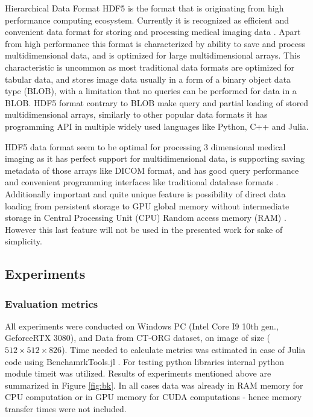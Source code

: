 \documentclass[preprint,12pt]{elsarticle}
\begin{document}
Hierarchical Data Format HDF5 \cite{hdf5} is the format that is originating from high performance computing ecosystem. Currently it is recognized as efficient and convenient data format for  storing and processing medical imaging data \cite{hdf5Medical}. Apart from high performance this format is characterized by ability to save and process multidimensional data, and is optimized for large multidimensional arrays. This characteristic is uncommon as most traditional data formats are optimized for tabular data, and stores image data usually in a form of a binary object data type (BLOB), with a limitation that no queries can be performed for data in a BLOB. HDF5 format contrary to BLOB make query and partial loading of stored multidimensional arrays, similarly to other popular data formats it has programming API in multiple widely used languages like Python, C++ and Julia.

HDF5 data format  seem to be optimal for processing 3 dimensional medical imaging as it has perfect support for multidimensional data, is supporting saving metadata of those arrays like DICOM format, and has good query performance and convenient programming interfaces like traditional database formats . Additionally important and quite unique feature is possibility of direct data loading from persistent storage to GPU global memory without intermediate storage in Central Processing Unit (CPU) Random access memory (RAM) \cite{hdf5GPU} . However this last feature will not be used in the presented work for sake of simplicity.

\subsection{Experiments}
\subsubsection{Evaluation metrics}
All experiments were conducted on Windows PC (Intel Core I9 10th gen., GeforceRTX 3080), and Data from CT-ORG \cite{CTORG} dataset, on image of size ($512 \times 512 \times 826$). Time needed to calculate metrics was estimated in case of Julia code using BenchamrkTools.jl \cite{BenchmarkTools}. For testing python libraries internal python module timeit was utilized. Results of experiments mentioned above are summarized in Figure \ref{fig:bk}. In all cases data was already in RAM memory for CPU computation or in GPU memory for CUDA computations - hence memory transfer times were not included.
\end{document}
